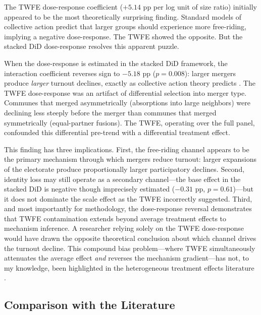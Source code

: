 \documentclass[12pt]{article}
\begin{document}
The TWFE dose-response coefficient ($+5.14$ pp per log unit of size ratio) initially appeared to be the most theoretically surprising finding. Standard models of collective action predict that larger groups should experience more free-riding, implying a negative dose-response. The TWFE showed the opposite. But the stacked DiD dose-response resolves this apparent puzzle.

When the dose-response is estimated in the stacked DiD framework, the interaction coefficient reverses sign to $-5.18$ pp ($p = 0.008$): larger mergers produce \textit{larger} turnout declines, exactly as collective action theory predicts \citep{olson1965logic}. The TWFE dose-response was an artifact of differential selection into merger type. Communes that merged asymmetrically (absorptions into large neighbors) were declining less steeply before the merger than communes that merged symmetrically (equal-partner fusions). The TWFE, operating over the full panel, confounded this differential pre-trend with a differential treatment effect.

This finding has three implications. First, the free-riding channel appears to be the primary mechanism through which mergers reduce turnout: larger expansions of the electorate produce proportionally larger participatory declines. Second, identity loss may still operate as a secondary channel---the base effect in the stacked DiD is negative though imprecisely estimated ($-0.31$ pp, $p = 0.61$)---but it does not dominate the scale effect as the TWFE incorrectly suggested. Third, and most importantly for methodology, the dose-response reversal demonstrates that TWFE contamination extends beyond average treatment effects to mechanism inference. A researcher relying solely on the TWFE dose-response would have drawn the opposite theoretical conclusion about which channel drives the turnout decline. This compound bias problem---where TWFE simultaneously attenuates the average effect \textit{and} reverses the mechanism gradient---has not, to my knowledge, been highlighted in the heterogeneous treatment effects literature \citep{goodmanbacon2021difference, sunAbraham2021, dechaisemartin2020two}.

\subsection{Comparison with the Literature}
\end{document}
